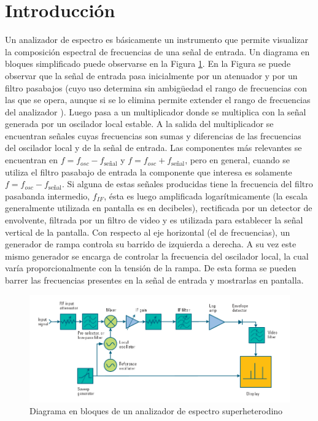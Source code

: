 \documentclass[a4paper,10pt]{article}
\begin{document}
	\section{Introducci\'on}
	Un analizador de espectro es b\'asicamente un instrumento que permite visualizar la composici\'on espectral de frecuencias de una se\~nal de entrada. Un diagrama en bloques simplificado puede observarse en la Figura \ref{diagramadebloques}. En la Figura se puede observar que la se\~nal de entrada pasa inicialmente por un atenuador y por un filtro pasabajos (cuyo uso determina sin ambig\"uedad el rango de frecuencias con las que se opera, aunque si se lo elimina permite extender el rango de frecuencias del analizador ). Luego pasa a un multiplicador donde se multiplica con la se\~nal generada por un oscilador local estable. A la salida del multiplicador se encuentran se\~nales cuyas frecuencias son sumas y diferencias de las frecuencias del oscilador local y de la se\~nal de entrada. Las componentes m\'as relevantes se encuentran en $f=f_{osc}-f_{\text{se\~nal}}$ y $f=f_{osc}+f_{\text{se\~nal}}$, pero en general, cuando se utiliza el filtro pasabajo de entrada la componente que interesa es solamente $f=f_{osc}-f_{\text{se\~nal}}$.
	Si alguna de estas se\~nales producidas tiene la frecuencia del filtro pasabanda intermedio, $f_{IF}$, \'esta es luego amplificada logar\'itmicamente (la escala generalmente utilizada en pantalla es en decibeles), rectificada por un detector de envolvente, filtrada por un filtro de video y es utilizada para establecer la se\~nal vertical de la pantalla.
	Con respecto al eje horizontal (el de frecuencias), un generador de rampa controla su barrido de izquierda a derecha. A su vez este mismo generador se encarga de controlar la frecuencia del oscilador local, la cual var\'ia proporcionalmente con la tensi\'on de la rampa. De esta forma se pueden barrer las frecuencias presentes en la se\~nal de entrada y mostrarlas en pantalla.
	\begin{figure}[!htb]
					\centering
					\includegraphics[width=12cm]
					{Imagenes/diagram.PNG}
					\caption{Diagrama en bloques de un analizador de espectro superheterodino}
					\label{diagramadebloques} 
			\end{figure}
	\newpage
\end{document}
